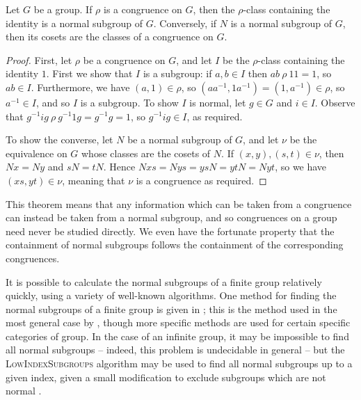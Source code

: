 \begin{theorem}
  \label{thm:normal-subgroups}
  Let $G$ be a group.  If $\rho$ is a congruence on $G$, then the $\rho$-class
  containing the identity is a normal subgroup of $G$.
  Conversely, if $N$ is a normal subgroup of $G$, then its cosets are the
  classes of a congruence on $G$.

  \begin{proof}
    First, let $\rho$ be a congruence on $G$, and let $I$ be the $\rho$-class
    containing the identity $1$.  First we show that $I$ is a subgroup: if
    $a,b \in I$ then $ab ~\rho~ 11 = 1$, so $ab \in I$.
    Furthermore, we have $(a,1) \in \rho$, so
    $(aa^{-1}, 1a^{-1}) = (1, a^{-1}) \in \rho$, so $a^{-1} \in I$, and so
    $I$ is a subgroup.  To show $I$ is normal, let $g \in G$ and $i \in I$.
    Observe that $g^{-1}ig ~\rho~ g^{-1}1g = g^{-1}g = 1$, so $g^{-1}ig \in I$,
    as required.

    To show the converse, let $N$ be a normal subgroup of $G$, and let $\nu$ be
    the equivalence on $G$ whose classes are the cosets of $N$.  If
    $(x,y), (s,t) \in \nu$, then $Nx=Ny$ and $sN=tN$.  Hence
    $Nxs=Nys=ysN=ytN=Nyt$, so we have $(xs,yt) \in \nu$, meaning that $\nu$ is
    a congruence as required.
  \end{proof}
\end{theorem}

This theorem means that any information which can be taken from a congruence can
instead be taken from a normal subgroup, and so congruences on a group need
never be studied directly.  We even have the fortunate property that the
containment of normal subgroups follows the containment of the corresponding
congruences.

It is possible to calculate the normal subgroups of a finite group relatively
quickly, using a variety of well-known algorithms.  One method for finding the
normal subgroups of a finite group is given in \cite{hulpke_1998}; this is the
method used in the most general case by \GAP{} \cite{gap}, though more specific
methods are used for certain specific categories of group.  In the case of an
infinite group, it may be impossible to find all normal subgroups -- indeed, this
problem is undecidable in general \cite[Theorem 3.17]{miller_1992} -- but the
\textsc{LowIndexSubgroups} algorithm \cite[\S 5.4]{cgt} may be used to find all
normal subgroups up to a given index, given a small modification to exclude
subgroups which are not normal \cite[\S 5.5]{cgt}.

